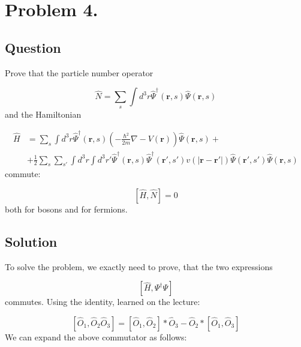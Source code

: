 \section*{Problem 4.}
\subsection*{Question}
Prove that the particle number operator

\begin{equation}
\hat{N}
=
\sum_{s} \int d^{3} r
\hat{\Psi}^{\dagger} \left( \boldsymbol{r}, s \right)
\hat{\Psi} \left( \boldsymbol{r}, s \right)
\end{equation}
and the Hamiltonian

\begin{align}
\hat{H}
&=
\sum_{s} \int d^{3} r
\hat{\Psi}^{\dagger} \left( \boldsymbol{r}, s \right)
\left( -\frac{\hbar^{2}}{2m} \nabla - V \left( \boldsymbol{r} \right) \right)
\hat{\Psi} \left( \boldsymbol{r}, s \right)
+ \nonumber \\
&+
\frac{1}{2} \sum_{s} \sum_{s'} \int d^{3} r \int d^{3} r'
\hat{\Psi}^{\dagger} \left( \boldsymbol{r}, s \right)
\hat{\Psi}^{\dagger} \left( \boldsymbol{r'}, s' \right)
v \left( \left| \boldsymbol{r} - \boldsymbol{r'} \right| \right)
\hat{\Psi} \left( \boldsymbol{r'}, s' \right)
\hat{\Psi} \left( \boldsymbol{r}, s \right)
\end{align}
commute:

\begin{equation}
\left[ \hat{H}, \hat{N} \right] = 0
\end{equation}
both for bosons and for fermions.

\subsection*{Solution}
To solve the problem, we exactly need to prove, that the two expressions

\begin{equation}
\left[ \hat{H}, \Psi^{\dagger} \Psi \right]
\end{equation}
commutes. Using the identity, learned on the lecture:

\begin{equation}
\left[ \hat{O}_{1}, \hat{O}_{2} \hat{O}_{3} \right]
=
\left[ \hat{O}_{1}, \hat{O}_{2} \right]*\hat{O}_{3}
-
\hat{O}_{2} * \left[ \hat{O}_{1}, \hat{O}_{3} \right]
\end{equation}
We can expand the above commutator as follows:

